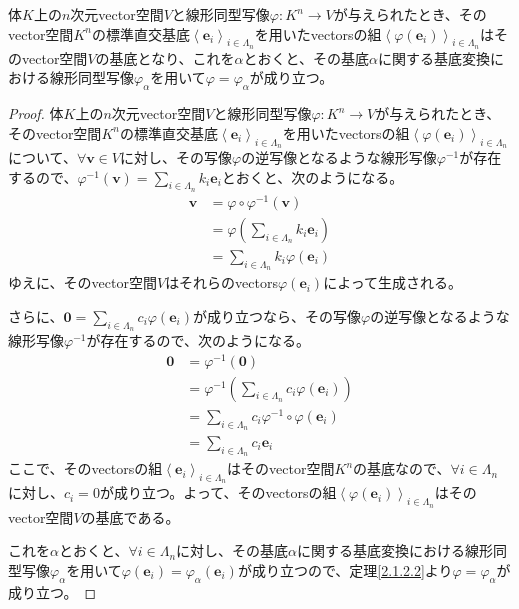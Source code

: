 \documentclass[dvipdfmx]{jsarticle}
\begin{document}
\begin{thm}
\label{2.1.5.2}
体$K$上の$n$次元vector空間$V$と線形同型写像$\varphi:K^{n} \rightarrow V$が与えられたとき、そのvector空間$K^{n}$の標準直交基底$\left\langle \mathbf{e}_{i} \right\rangle_{i \in \varLambda_{n}}$を用いたvectorsの組$\left\langle \varphi\left( \mathbf{e}_{i} \right) \right\rangle_{i \in \varLambda_{n}}$はそのvector空間$V$の基底となり、これを$\alpha$とおくと、その基底$\alpha$に関する基底変換における線形同型写像$\varphi_{\alpha}$を用いて$\varphi = \varphi_{\alpha}$が成り立つ。
\end{thm}
\begin{proof}
体$K$上の$n$次元vector空間$V$と線形同型写像$\varphi:K^{n} \rightarrow V$が与えられたとき、そのvector空間$K^{n}$の標準直交基底$\left\langle \mathbf{e}_{i} \right\rangle_{i \in \varLambda_{n}}$を用いたvectorsの組$\left\langle \varphi\left( \mathbf{e}_{i} \right) \right\rangle_{i \in \varLambda_{n}}$について、$\forall\mathbf{v} \in V$に対し、その写像$\varphi$の逆写像となるような線形写像$\varphi^{- 1}$が存在するので、$\varphi^{- 1}\left( \mathbf{v} \right) = \sum_{i \in \varLambda_{n}} {k_{i}\mathbf{e}_{i}}$とおくと、次のようになる。
\begin{align*}
\mathbf{v} &= \varphi \circ \varphi^{- 1}\left( \mathbf{v} \right)\\
&= \varphi\left( \sum_{i \in \varLambda_{n}} {k_{i}\mathbf{e}_{i}} \right)\\
&= \sum_{i \in \varLambda_{n}} {k_{i}\varphi\left( \mathbf{e}_{i} \right)}
\end{align*}
ゆえに、そのvector空間$V$はそれらのvectors$\varphi\left( \mathbf{e}_{i} \right)$によって生成される。\par
さらに、$\mathbf{0} = \sum_{i \in \varLambda_{n}} {c_{i}\varphi\left( \mathbf{e}_{i} \right)}$が成り立つなら、その写像$\varphi$の逆写像となるような線形写像$\varphi^{- 1}$が存在するので、次のようになる。
\begin{align*}
\mathbf{0} &= \varphi^{- 1}\left( \mathbf{0} \right)\\
&= \varphi^{- 1}\left( \sum_{i \in \varLambda_{n}} {c_{i}\varphi\left( \mathbf{e}_{i} \right)} \right)\\
&= \sum_{i \in \varLambda_{n}} {c_{i}\varphi^{- 1} \circ \varphi\left( \mathbf{e}_{i} \right)}\\
&= \sum_{i \in \varLambda_{n}} {c_{i}\mathbf{e}_{i}}
\end{align*}
ここで、そのvectorsの組$\left\langle \mathbf{e}_{i} \right\rangle_{i \in \varLambda_{n}}$はそのvector空間$K^{n}$の基底なので、$\forall i \in \varLambda_{n}$に対し、$c_{i} = 0$が成り立つ。よって、そのvectorsの組$\left\langle \varphi\left( \mathbf{e}_{i} \right) \right\rangle_{i \in \varLambda_{n}}$はそのvector空間$V$の基底である。\par
これを$\alpha$とおくと、$\forall i \in \varLambda_{n}$に対し、その基底$\alpha$に関する基底変換における線形同型写像$\varphi_{\alpha}$を用いて$\varphi\left( \mathbf{e}_{i} \right) = \varphi_{\alpha}\left( \mathbf{e}_{i} \right)$が成り立つので、定理\ref{2.1.2.2}より$\varphi = \varphi_{\alpha}$が成り立つ。
\end{proof}
\end{document}
